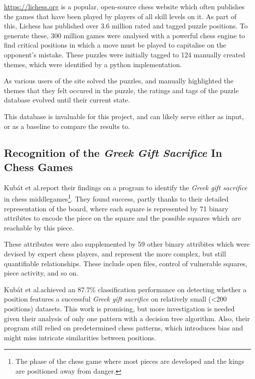 \url{https://lichess.org} is a popular, open-source chess website which often
publishes the games that have been played by players of all skill levels on it.
As part of this, Lichess has published over 3.6 million rated and tagged puzzle
positions.\cite{lichessPuzzles} To generate these, 300 million games were
analysed with a powerful chess engine to find critical positions in which a
move must be played to capitalise on the opponent's mistake. These puzzles were
initially tagged to 124 manually created themes,\cite{lichessXML} which were
identified by a python implementation.\cite{lichessTagger} 

As various users of the site solved the puzzles, and manually highlighted the
themes that they felt occured in the puzzle, the ratings and tags of the puzzle
database evolved until their current state.

This database is invaluable for this project, and can likely serve either as
input, or as a baseline to compare the results to.

\subsection{Recognition of the \emph{Greek Gift Sacrifice} In Chess Games}

Kub\'{a}t et al.\@ report their findings on a program \cite{middlegamePatterns}
to identify the \emph{Greek gift sacrifice} in chess middlegames\footnote{The
phase of the chess game where most pieces are developed and the kings are
positioned away from danger.}. They found success, partly thanks to their
detailed representation of the board, where each square is represented by 71
binary attribites \cite{middlegamePatterns} to encode the piece on the square
and the possible squares which are reachable by this piece. 

These attributes were also supplemented by 59 other binary attribites which
were devised by expert chess players, and represent the more complex, but still
quantifiable relationships.\cite{middlegamePatterns} These include open files,
control of vulnerable squares, piece activity, and so on.

Kub\'{a}t et al.\@ achieved an 87.7\% classification performance on detecting
whether a position features a successful \emph{Greek gift sacrifice} on
relatively small (<200 positions) datasets. This work is promising, but more
investigation is needed given their analysis of only one pattern with a
decision tree algorithm. Also, their program still relied on predetermined
chess patterns, which introduces bias and might miss intricate similarities
between positions.

